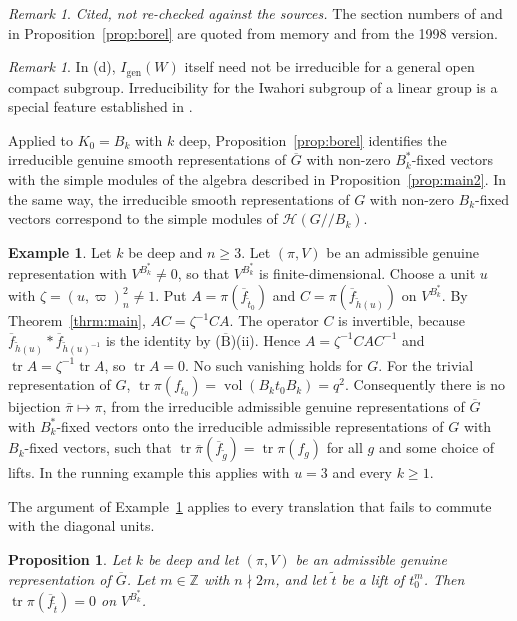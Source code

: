 \documentclass[12pt,letterpaper]{amsart}
\numberwithin{equation}{section}
\newtheorem{proposition}[theorem]{Proposition}
\theoremstyle{definition}
\newtheorem{example}[theorem]{Example}
\theoremstyle{remark}
\newtheorem{remark}[theorem]{Remark}
\newtheorem{vremark}{Remark}
\DeclareMathOperator{\vol}{vol}
\DeclareMathOperator{\tr}{tr}
\newcommand{\cH}{\mathcal{H}}
\newcommand{\Z}{\mathbb{Z}}
\newcommand{\Gbar}{\overline{G}}
\newcommand{\gen}{\mathrm{gen}}
\newcommand{\fbar}{\overline{f}}
\newcommand{\Hlin}{\cH(G/\!/B_k)}
\begin{document}
\begin{vremark}
\label{vrem:borel}
\emph{Cited, not re-checked against the sources.} The section numbers
of \cite{Bo76} and \cite{BH06} in Proposition~\ref{prop:borel} are
quoted from memory and from the 1998 version.
\end{vremark}

\begin{remark}
In (d), $I_{\gen}(W)$ itself need not be irreducible for a general
open compact subgroup. Irreducibility for the Iwahori subgroup of a
linear group is a special feature established in \cite{Bo76}.
\end{remark}

Applied to $K_0=B_k$ with $k$ deep, Proposition~\ref{prop:borel}
identifies the irreducible genuine smooth representations of $\Gbar$
with non-zero $B_k^*$-fixed vectors with the simple modules of the
algebra described in Proposition~\ref{prop:main2}. In the same way, the
irreducible smooth representations of $G$ with non-zero $B_k$-fixed
vectors correspond to the simple modules of $\Hlin$.

\begin{example}
\label{ex:trace}
Let $k$ be deep and $n\geq 3$. Let $(\pi,V)$ be an admissible genuine
representation with $V^{B_k^*}\neq 0$, so that $V^{B_k^*}$ is
finite-dimensional. Choose a unit $u$ with
$\zeta=(u,\varpi)_n^2\neq1$. Put $A=\pi(\fbar_{\tilde t_0})$ and
$C=\pi(\fbar_{\tilde h(u)})$ on $V^{B_k^*}$. By
Theorem~\ref{thrm:main}, $AC=\zeta^{-1}CA$. The operator $C$ is
invertible, because $\fbar_{\tilde h(u)}*\fbar_{\tilde h(u)^{-1}}$ is
the identity by ($\overline{\mbox{B}}$)(ii). Hence
$A=\zeta^{-1}CAC^{-1}$ and $\tr A=\zeta^{-1}\tr A$, so $\tr A=0$. No
such vanishing holds for $G$. For the trivial representation of $G$,
$\tr\pi(f_{t_0})=\vol(B_kt_0B_k)=q^2$. Consequently there is no
bijection $\overline\pi\mapsto\pi$, from the irreducible admissible
genuine representations of $\Gbar$ with $B_k^*$-fixed vectors onto the
irreducible admissible representations of $G$ with $B_k$-fixed
vectors, such that
$\tr\overline\pi(\fbar_{\tilde g})=\tr\pi(f_g)$ for all $g$ and some
choice of lifts. In the running example this applies with $u=3$ and
every $k\geq 1$.
\end{example}

The argument of Example~\ref{ex:trace} applies to every translation that
fails to commute with the diagonal units.

\begin{proposition}
\label{prop:traceless}
Let $k$ be deep and let $(\pi,V)$ be an admissible genuine
representation of $\Gbar$. Let $m\in\Z$ with $n\nmid 2m$, and let
$\tilde t$ be a lift of $t_0^m$. Then $\tr\pi(\fbar_{\tilde t})=0$ on
$V^{B_k^*}$.
\end{proposition}
\end{document}

